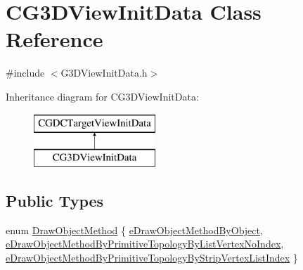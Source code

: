 \hypertarget{class_c_g3_d_view_init_data}{}\section{C\+G3\+D\+View\+Init\+Data Class Reference}
\label{class_c_g3_d_view_init_data}


{\ttfamily \#include $<$G3\+D\+View\+Init\+Data.\+h$>$}

Inheritance diagram for C\+G3\+D\+View\+Init\+Data\+:\begin{figure}[H]
\begin{center}
\leavevmode
\includegraphics[height=2.000000cm]{class_c_g3_d_view_init_data}
\end{center}
\end{figure}
\subsection*{Public Types}
\begin{DoxyCompactItemize}
\item 
enum \hyperlink{class_c_g3_d_view_init_data_a87424491f9faef1783b3b08114a2ebb0}{Draw\+Object\+Method} \{ \hyperlink{class_c_g3_d_view_init_data_a87424491f9faef1783b3b08114a2ebb0a21552aeb0f45ea30d1c4e69f2c429959}{e\+Draw\+Object\+Method\+By\+Object}, 
\hyperlink{class_c_g3_d_view_init_data_a87424491f9faef1783b3b08114a2ebb0a516d74190facd2307f8d913e0e5d0927}{e\+Draw\+Object\+Method\+By\+Primitive\+Topology\+By\+List\+Vertex\+No\+Index}, 
\hyperlink{class_c_g3_d_view_init_data_a87424491f9faef1783b3b08114a2ebb0a5c155e9ec9c193f6fae7100818d9930d}{e\+Draw\+Object\+Method\+By\+Primitive\+Topology\+By\+Strip\+Vertex\+List\+Index}
 \}
\end{DoxyCompactItemize}

